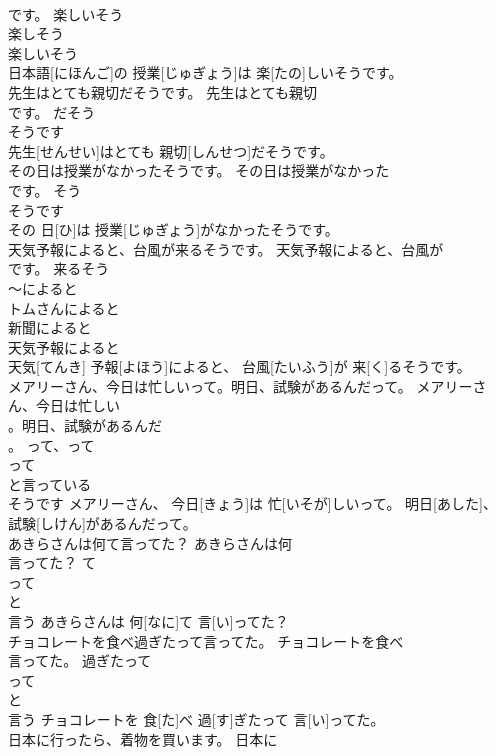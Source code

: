 \documentclass[8pt]{extreport}
\begin{document}
\begin{CJK}{UTF8}{min}
\\	です。	楽しいそう	
\\	楽しそう 
\\	楽しいそう 
\\	日本語[にほんご]の 授業[じゅぎょう]は 楽[たの]しいそうです。	
\\	先生はとても親切だそうです。	先生はとても親切
\\	です。	だそう	
\\	そうです 
\\	先生[せんせい]はとても 親切[しんせつ]だそうです。	
\\	その日は授業がなかったそうです。	その日は授業がなかった
\\	です。	そう	
\\	そうです 
\\	その 日[ひ]は 授業[じゅぎょう]がなかったそうです。	
\\	天気予報によると、台風が来るそうです。	天気予報によると、台風が
\\	です。	来るそう	
\\	～によると 
\\	トムさんによると 
\\	新聞によると 
\\	天気予報によると 
\\	天気[てんき] 予報[よほう]によると、 台風[たいふう]が 来[く]るそうです。	
\\	メアリーさん、今日は忙しいって。明日、試験があるんだって。	メアリーさん、今日は忙しい
\\	。明日、試験があるんだ
\\	。	って、って	
\\	って 
\\	と言っている 
\\	そうです	メアリーさん、 今日[きょう]は 忙[いそが]しいって。 明日[あした]、 試験[しけん]があるんだって。	
\\	あきらさんは何て言ってた？	あきらさんは何
\\	言ってた？	て	
\\	って 
\\	と 
\\	言う	あきらさんは 何[なに]て 言[い]ってた？	
\\	チョコレートを食べ過ぎたって言ってた。	チョコレートを食べ
\\	言ってた。	過ぎたって	
\\	って 
\\	と 
\\	言う	チョコレートを 食[た]べ 過[す]ぎたって 言[い]ってた。	
\\	日本に行ったら、着物を買います。	日本に

\end{CJK}
\end{document}
